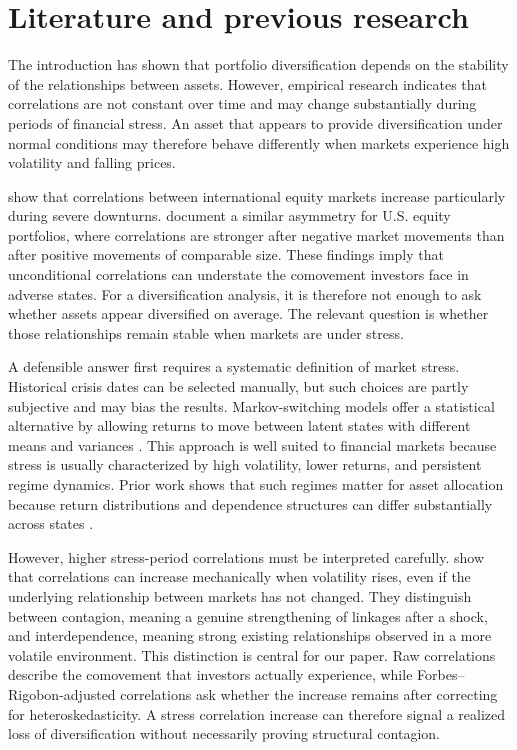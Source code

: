 \section{Literature and previous research}
\label{sec:literature}

The introduction has shown that portfolio diversification depends on the stability of the
relationships between assets. However, empirical research indicates that correlations are
not constant over time and may change substantially during periods of financial stress.
An asset that appears to provide diversification under normal conditions may therefore
behave differently when markets experience high volatility and falling prices.

\citet{longin2001extreme} show that correlations between international equity markets
increase particularly during severe downturns. \citet{angchen2002asymmetric} document a similar
asymmetry for U.S. equity portfolios, where correlations are stronger after negative market
movements than after positive movements of comparable size. These findings imply that
unconditional correlations can understate the comovement investors face in adverse states.
For a diversification analysis, it is therefore not enough to ask whether assets
appear diversified on average. The relevant question is whether those relationships remain stable
when markets are under stress.

A defensible answer first requires a systematic definition of market stress. Historical crisis
dates can be selected manually, but such choices are partly subjective and may bias the
results. Markov-switching models offer a statistical alternative by allowing returns to move
between latent states with different means and variances \citep{hamilton1989new}. This
approach is well suited to financial markets because stress is usually characterized by high
volatility, lower returns, and persistent regime dynamics. Prior work shows that such regimes
matter for asset allocation because return distributions and dependence structures can differ
substantially across states \citep{ang2002international,guidolin2007asset}.

However, higher stress-period correlations must be interpreted carefully. \citet{forbesrigobon2002}
show that correlations can increase mechanically when volatility rises, even if the underlying
relationship between markets has not changed. They distinguish between contagion, meaning a
genuine strengthening of linkages after a shock, and interdependence, meaning strong existing
relationships observed in a more volatile environment. This distinction is central for our
paper. Raw correlations describe the comovement that investors actually experience, while
Forbes--Rigobon-adjusted correlations ask whether the increase remains after correcting for
heteroskedasticity. A stress correlation increase can therefore signal a realized loss of
diversification without necessarily proving structural contagion.

